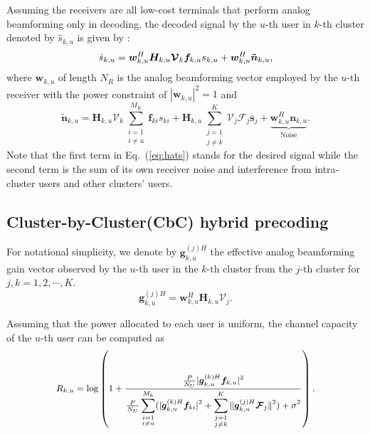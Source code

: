 \documentclass[conference]{IEEEtran}
\begin{document}
{Assuming the receivers are all low-cost terminals that perform analog beamforming only in decoding, the decoded signal by the $u$-th user in $k$-th cluster denoted by $\hat{s}_{k,u}$ is given by :
\begin{equation}{\label{eq:hats}}
\hat{s}_{k,u} = \bm{w}_{k,u}^H \bm{H}_{k,u} \bm{\mathcal{V}}_k \bm{f}_{k,u} s_{k,u} + \bm{w}_{k,u}^H \bm{\tilde{n}}_{k,u},
\end{equation}
where ${\bm w}_{k,u}$ of length $N_R$ is the analog beamforming vector employed by the $u$-th receiver with the power constraint of $|\bm{w}_{k,u}|^2=1$ and
\begin{equation}\label{Eq:ntilde}
\bm{\tilde{n}}_{k,u}=\bm{H}_{k,u} \bm{\mathcal{V}}_k\sum_{\substack{i=1 \\ i\neq u}}^{M_K}\bm{f}_{ki}s_{ki} + \bm{H}_{k,u}\sum_{\substack{j=1\\j\neq k}}^{K}\bm{\mathcal{V}}_j\bm{\mathcal{F}}_j\bm{s}_j+  \underbrace{\bm{w}_{k,u}^H \bm{n}_{k,u}}_\text{Noise}.
\end{equation}
Note that the first term in Eq.~(\ref{eq:hats}) stands for the desired signal while the second term is the sum of its own receiver noise and interference from intra-cluster users and other clusters' users.

\subsection{Cluster-by-Cluster(CbC) hybrid precoding}
For notational simplicity, we denote by ${\bm{g}}^{(j)H}_{k,u}$ the effective analog beamforming gain vector observed by the $u$-th user in the $k$-th cluster from the $j$-th cluster for $j,k=1,2,\cdots,K$.
\begin{equation}\label{eq:def}
{\bm{g}}^{(j)H}_{k,u} = \bm{w}^H_{k,u} \bm{H}_{k,u} \bm{\mathcal{V}}_{j}.
\end{equation}

Assuming that the power allocated to each user is uniform, the channel capacity of the $u$-th user can be computed as
\begin{equation}\small\label{eq:convenR}
R_{k,u} = \log\left(1+\frac{\frac{P}{N_U}|{\bm{g}}_{k,u}^{(k)H} \bm{f}_{k,u}|^2}{\frac{P}{N_U}\displaystyle\sum_{\substack{i=1 \\ i\neq u}}^{M_k}(|{\bm{g}}_{k,u}^{(k)H}\bm{f}_{ki}|^2+\displaystyle\sum_{\substack{j=1\\j\neq k}}^{K}\|\bm{g}_{k,u}^{(j)H}\bm{\mathcal{F}}_j\|^2)+\sigma^2}\right).
\end{equation}

}
\end{document}
